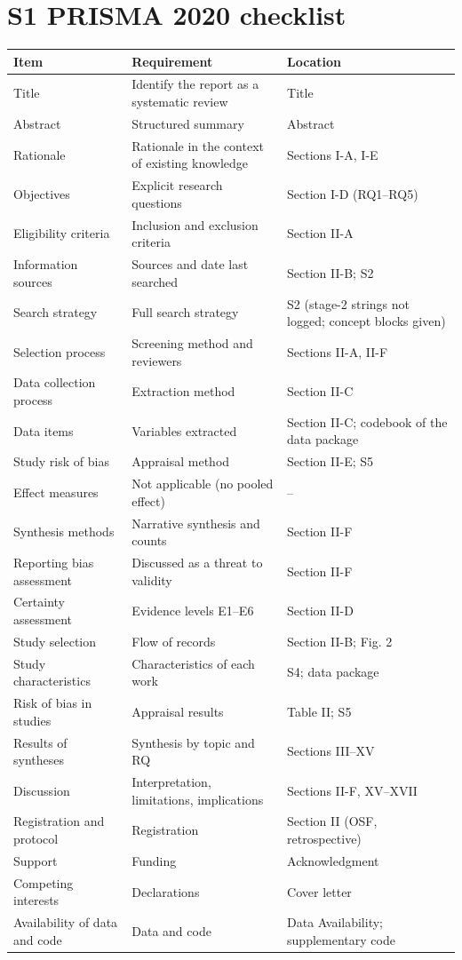 \documentclass[10pt,a4paper]{article}
\begin{document}
\section*{S1 PRISMA 2020 checklist}
\begin{longtable}{@{}>{\raggedright\arraybackslash}p{4cm}>{\raggedright\arraybackslash}p{6.5cm}>{\raggedright\arraybackslash}p{5.5cm}@{}}
\toprule \textbf{Item} & \textbf{Requirement} & \textbf{Location} \\ \midrule \endhead
Title & Identify the report as a systematic review & Title \\
Abstract & Structured summary & Abstract \\
Rationale & Rationale in the context of existing knowledge & Sections I-A, I-E \\
Objectives & Explicit research questions & Section I-D (RQ1--RQ5) \\
Eligibility criteria & Inclusion and exclusion criteria & Section II-A \\
Information sources & Sources and date last searched & Section II-B; S2 \\
Search strategy & Full search strategy & S2 (stage-2 strings not logged; concept blocks given) \\
Selection process & Screening method and reviewers & Sections II-A, II-F \\
Data collection process & Extraction method & Section II-C \\
Data items & Variables extracted & Section II-C; codebook of the data package \\
Study risk of bias & Appraisal method & Section II-E; S5 \\
Effect measures & Not applicable (no pooled effect) & -- \\
Synthesis methods & Narrative synthesis and counts & Section II-F \\
Reporting bias assessment & Discussed as a threat to validity & Section II-F \\
Certainty assessment & Evidence levels E1--E6 & Section II-D \\
Study selection & Flow of records & Section II-B; Fig. 2 \\
Study characteristics & Characteristics of each work & S4; data package \\
Risk of bias in studies & Appraisal results & Table II; S5 \\
Results of syntheses & Synthesis by topic and RQ & Sections III--XV \\
Discussion & Interpretation, limitations, implications & Sections II-F, XV--XVII \\
Registration and protocol & Registration & Section II (OSF, retrospective) \\
Support & Funding & Acknowledgment \\
Competing interests & Declarations & Cover letter \\
Availability of data and code & Data and code & Data Availability; supplementary code \\
\bottomrule\end{longtable}
\end{document}
